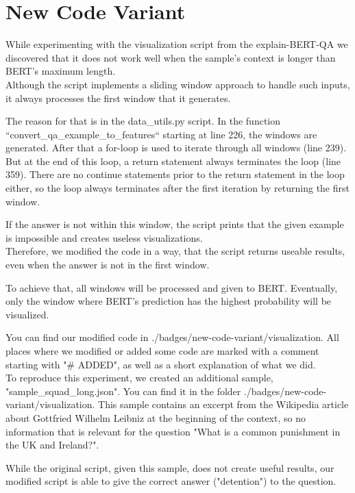 \documentclass{article}
\begin{document}
	\section{New Code Variant}
	While experimenting with the visualization script from the explain-BERT-QA we discovered that it does not work well when the sample's context is longer than BERT's maximum length.\\
	
	Although the script implements a sliding window approach to handle such inputs, it always processes the first window that it generates.
	
	The reason for that is in the data\_utils.py script. In the function “convert\_qa\_example\_to\_features“ starting at line 226, the windows are generated. After that a for-loop is used to iterate through all windows (line 239). But at the end of this loop, a return statement always terminates the loop (line 359). There are no continue statements prior to the return statement in the loop either, so the loop always terminates after the first iteration by returning the first window.
	
	If the answer is not within this window, the script prints that the given example is impossible and creates useless visualizations.\\
	
	Therefore, we modified the code in a way, that the script returns useable results, even when the answer is not in the first window.
	
	To achieve that, all windows will be processed and given to BERT. Eventually, only the window where BERT’s prediction has the highest probability will be visualized. 
	
	You can find our modified code in ./badges/new-code-variant/visualization. All places where we modified or added some code are marked with a comment starting with "\# ADDED", as well as a short explanation of what we did.\\
	
	To reproduce this experiment, we created an additional sample, "sample\_squad\_long.json". You can find it in the folder ./badges/new-code-variant/visualization. This sample contains an excerpt from the Wikipedia article about Gottfried Wilhelm Leibniz at the beginning of the context, so no information that is relevant for the question "What is a common punishment in the UK and Ireland?".
	
	While the original script, given this sample, does not create useful results, our modified script is able to give the correct answer ("detention") to the question.
	
	
\end{document}

